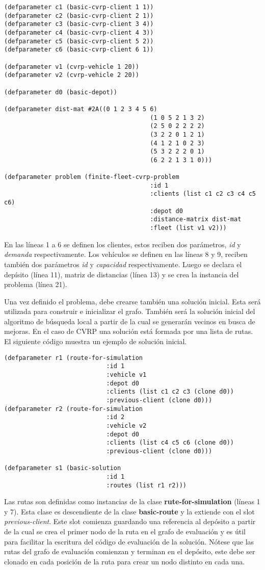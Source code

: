  \begin{lstlisting}
(defparameter c1 (basic-cvrp-client 1 1))
(defparameter c2 (basic-cvrp-client 2 1))
(defparameter c3 (basic-cvrp-client 3 4))
(defparameter c4 (basic-cvrp-client 4 3))
(defparameter c5 (basic-cvrp-client 5 2))
(defparameter c6 (basic-cvrp-client 6 1))

(defparameter v1 (cvrp-vehicle 1 20))
(defparameter v2 (cvrp-vehicle 2 20))
	
(defparameter d0 (basic-depot))

(defparameter dist-mat #2A((0 1 2 3 4 5 6)
		  								(1 0 5 2 1 3 2)
		  								(2 5 0 2 2 2 2)
		  								(3 2 2 0 1 2 1)
		  								(4 1 2 1 0 2 3)
		  								(5 3 2 2 2 0 1)
		  								(6 2 2 1 3 1 0)))
		  								
(defparameter problem (finite-fleet-cvrp-problem 
										:id 1 
										:clients (list c1 c2 c3 c4 c5 c6)
										:depot d0 
										:distance-matrix dist-mat 
										:fleet (list v1 v2)))
\end{lstlisting}

En las líneas 1 a 6 se definen los clientes, estos reciben dos parámetros, \textit{id} y \textit{demanda} respectivamente. Los vehículos se definen en las líneas 8 y 9, reciben también dos parámetros \textit{id} y \textit{capacidad} respectivamente. Luego se declara el depísito (línea 11), matriz de distancias (línea 13) y se crea la instancia del problema (línea 21).

Una vez definido el problema, debe crearse también una solución inicial. Esta será utilizada para construir e inicializar el grafo. También será la solución inicial del algoritmo de búsqueda local a partir de la cual se generarán vecinos en busca de mejoras. En el caso de CVRP una solución está formada por una lista de rutas. El siguiente código muestra un ejemplo de solución inicial.


\begin{lstlisting}
(defparameter r1 (route-for-simulation 
							:id 1
							:vehicle v1 
							:depot d0
							:clients (list c1 c2 c3 (clone d0))
							:previous-client (clone d0)))
(defparameter r2 (route-for-simulation 
							:id 2 
							:vehicle v2
							:depot d0
							:clients (list c4 c5 c6 (clone d0))
							:previous-client (clone d0)))

(defparameter s1 (basic-solution
							:id 1 
							:routes (list r1 r2)))
\end{lstlisting}

Las rutas son definidas como instancias de la clase \textbf{rute-for-simulation} (líneas 1 y 7). Esta clase es descendiente de la clase \textbf{basic-route} y la extiende con el slot \textit{previous-client}. Este slot comienza guardando una referencia al depósito a partir de la cual se crea el primer nodo de la ruta en el grafo de evaluación y es útil para facilitar la escritura del código de evaluación de la solución. Nótese que las rutas del grafo de evaluación comienzan y terminan en el depósito, este debe ser clonado en cada posición de la ruta para crear un nodo distinto en cada una.

